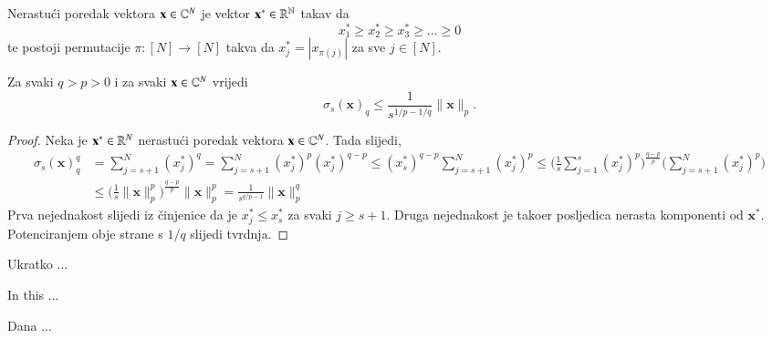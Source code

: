 \documentclass[a4paper,twoside,12pt]{memoir} %
\newcommand{\vect}[1]{\mathbf{#1}}
\begin{document}
\begin{defn}
    Nerastu\'ci poredak vektora $\vect{x} \in \C^{N}$ je vektor $\vect{x}^* \in \R^{\N}$ takav da
    $$x^*_1 \geq x^*_2 \geq x^*_3 \geq \dots \geq 0$$
    te postoji permutacije $\pi : [N]\rightarrow[N]$ takva da $x^*_j=|x_{\pi(j)}|$ za sve $j\in [N]$.
\end{defn}
\begin{prop}
    Za svaki $q > p > 0$ i za svaki $\vect{x}\in \C^{N}$ vrijedi
    $$\sigma_s(\vect{x})_q \leq \frac{1}{s^{1/p - 1/q}}\|\vect{x}\|_p.$$
\end{prop}
\begin{proof}
    Neka je $\vect{x}^* \in \R^N$ nerastu\'ci poredak vektora $\vect{x}\in\C^N$. Tada slijedi,
    \begin{equation*}
    \begin{split} 
        \sigma_s(\vect{x})_q^q &= \sum_{j=s+1}^{N}(x_j^*)^q=\sum_{j=s+1}^{N}(x_j^*)^p(x_j^*)^{q-p} \leq (x_s^*)^{q-p} \sum_{j=s+1}^{N}(x_j^*)^p \leq \bigg(\frac{1}{s}\sum_{j=1}^{s}(x_j^*)^p\bigg)^{\frac{q-p}{p}}\bigg( \sum_{j=s+1}^N(x_j^*)^p\bigg) \\ &\leq \bigg( \frac{1}{s} \|\vect{x}\|_p^p \bigg)^{\frac{q-p}{p}}\|\vect{x}\|_p^p = \frac{1}{s^{q/p-1}}\|\vect{x}\|_p^q
    \end{split}
    \end{equation*}
    Prva nejednakost slijedi iz \v{c}injenice da je $x_j^* \leq x_s^*$ za svaki $j \geq s+1$. Druga nejednakost je tako\dj er posljedica nerasta komponenti od $\vect{x}^*$. Potenciranjem obje strane s $1/q$ slijedi tvrdnja.
\end{proof}


\nocite{*}



\pagestyle{empty} %


\begin{sazetak}
Ukratko ...
\end{sazetak}

\begin{summary}
In this ...
\end{summary}


\begin{cv}
Dana ...
\end{cv}
\end{document}
